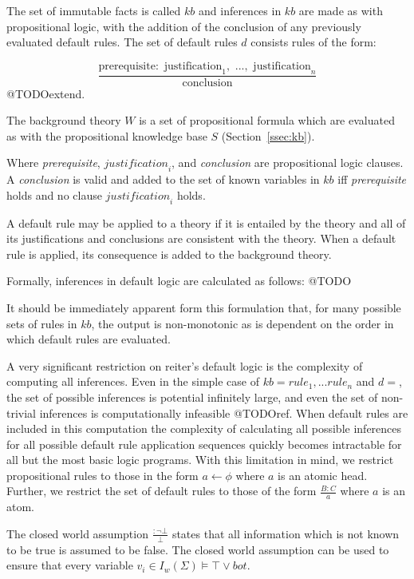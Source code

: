 The set of immutable facts is called $kb$ and inferences in $kb$ are made as with propositional logic, with the addition of the conclusion of any previously evaluated default rules. The set of default rules $d$ consists rules of the form:

\[\frac{\textrm{prerequisite}:\textrm{ justification}_1, \textrm{ ...}, \textrm{ justification}_n}{\textrm{conclusion}}\] @TODOextend.

The background theory $W$ is a set of propositional formula which are evaluated as with the propositional knowledge base $S$ (Section~\ref{ssec:kb}).

Where \textit{prerequisite}, $\textit{justification}_i$, and \textit{conclusion} are propositional logic clauses. A \textit{conclusion} is valid and added to the set of known variables in $kb$ iff \textit{prerequisite} holds and no clause $\textit{justification}_i$ holds.


A default rule may be applied to a theory if it is entailed by the theory and all of its justifications and conclusions are consistent with the theory. When a default rule is applied, its consequence is added to the background theory.

Formally, inferences in default logic are calculated as follows:
@TODO

It should be immediately apparent form this formulation that, for many possible sets of rules in $kb$, the output is non-monotonic as is dependent on the order in which default rules are evaluated.

A very significant restriction on reiter's default logic is the complexity of computing all inferences. Even in the simple case of $kb={rule_1,...rule_n}$ and $d={}$, the set of possible inferences is potential infinitely large, and even the set of non-trivial inferences is computationally infeasible @TODOref. When default rules are included in this computation the complexity of calculating all possible inferences for all possible default rule application sequences quickly becomes intractable for all but the most basic logic programs. With this limitation in mind, we restrict propositional rules to those in the form $a\leftarrow\phi$ where $a$ is an atomic head. Further, we restrict the set of default rules to those of the form $\frac{B:C}{a}$ where $a$ is an atom.

The closed world assumption $\frac{: \lnot \bot}{\bot}$ states that all information which is not known to be true is assumed to be false. The closed world assumption can be used to ensure that every variable $v_i \in I_w(\Sigma) \models \top \lor bot$.